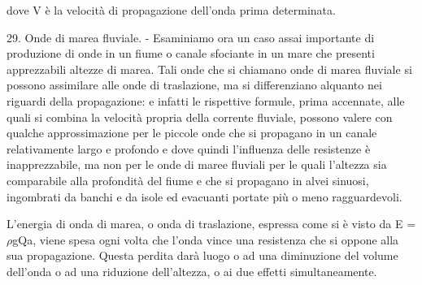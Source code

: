 \documentclass[a4paper]{article}
\begin{document}
dove V è la velocità di propagazione dell'onda prima determinata.

29. Onde di marea fluviale. - Esaminiamo ora un caso assai importante di produzione di onde in un fiume o canale sfociante in un mare che presenti apprezzabili altezze di marea. Tali onde che si chiamano onde di marea fluviale si possono assimilare alle onde di traslazione, ma si differenziano alquanto nei riguardi della propagazione: e infatti le rispettive formule, prima accennate, alle quali si combina la velocità propria della corrente fluviale, possono valere con qualche approssimazione per le piccole onde che si propagano in un canale relativamente largo e profondo e dove quindi l'influenza delle resistenze è inapprezzabile, ma non per le onde di maree fluviali per le quali l'altezza sia comparabile alla profondità del fiume e che si propagano in alvei sinuosi, ingombrati da banchi e da isole ed evacuanti portate più o meno ragguardevoli.

L'energia di onda di marea, o onda di traslazione, espressa come si è visto da E = $\rho$gQa, viene spesa ogni volta che l'onda vince una resistenza che si oppone alla sua propagazione. Questa perdita darà luogo o ad una diminuzione del volume dell'onda o ad una riduzione dell'altezza, o ai due effetti simultaneamente.
\end{document}
